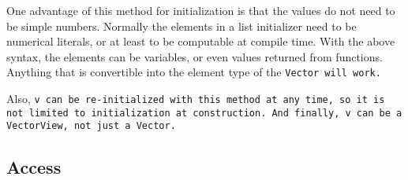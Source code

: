 One advantage of this method for initialization is that the values do not need to be simple numbers.
Normally the elements in a list initializer need to be numerical literals, or at least to be 
computable at compile time.
With the above syntax, the elements can be variables, 
or even values returned from functions.  Anything that is convertible
into the element type of the \tt{Vector} will work.

Also, \tt{v} can be re-initialized with this method at any time, so it is not limited to 
initialization at construction.  And finally, \tt{v} can be a \tt{VectorView}, not just a \tt{Vector}.


\subsection{Access}
\label{Vector_Access}

